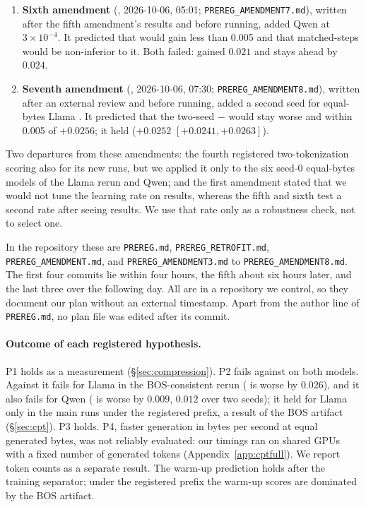 \begin{enumerate}
  \item \textbf{Sixth amendment} (\commitH{}, 2026-10-06, 05:01; \texttt{PREREG\_AMENDMENT7.md}), written after the fifth amendment's results and before running, added Qwen \RO{} at $3{\times}10^{-4}$. It predicted that \RO{} would gain less than 0.005 and that matched-steps \RII{} would be non-inferior to it. Both failed: \RO{} gained $0.021$ and stays ahead by $0.024$.
  \item \textbf{Seventh amendment} (\commitI{}, 2026-10-06, 07:30; \texttt{PREREG\_AMENDMENT8.md}), written after an external review and before running, added a second seed for equal-bytes Llama \RII{}. It predicted that the two-seed \RII{} $-$ \RI{} would stay worse and within 0.005 of $+0.0256$; it held ($+0.0252$ $[+0.0241, +0.0263]$).
\end{enumerate}
Two departures from these amendments: the fourth registered two-tokenization scoring also for its new runs, but we applied it only to the six seed-0 equal-bytes models of the Llama rerun and Qwen; and the first amendment stated that we would not tune the learning rate on results, whereas the fifth and sixth test a second rate after seeing results. We use that rate only as a robustness check, not to select one.

In the repository these are \texttt{PREREG.md}, \texttt{PREREG\_RETROFIT.md}, \texttt{PREREG\_AMENDMENT.md}, and \texttt{PREREG\_AMENDMENT3.md} to \texttt{PREREG\_AMENDMENT8.md}. The first four commits lie within four hours, the fifth about six hours later, and the last three over the following day. All are in a repository we control, so they document our plan without an external timestamp. Apart from the author line of \texttt{PREREG.md}, no plan file was edited after its commit.

\paragraph{Outcome of each registered hypothesis.} P1 holds as a measurement (\S\ref{sec:compression}). P2 fails against \RO{} on both models. Against \RI{} it fails for Llama in the BOS-consistent rerun (\RII{} is worse by $0.026$), and it also fails for Qwen (\RII{} is worse by $0.009$, $0.012$ over two seeds); it held for Llama only in the main runs under the registered prefix, a result of the BOS artifact (\S\ref{sec:cpt}). P3 holds. P4, faster generation in bytes per second at equal generated bytes, was not reliably evaluated: our timings ran on shared GPUs with a fixed number of generated tokens (Appendix~\ref{app:cptfull}). We report token counts as a separate result. The warm-up prediction holds after the training separator; under the registered prefix the warm-up scores are dominated by the BOS artifact.

